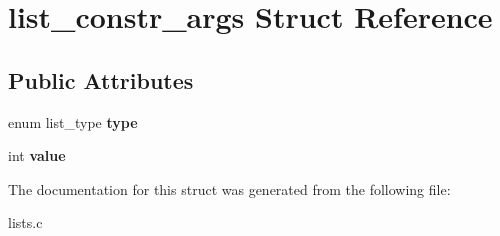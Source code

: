 \hypertarget{structlist__constr__args}{}\section{list\+\_\+constr\+\_\+args Struct Reference}
\label{structlist__constr__args}
\subsection*{Public Attributes}
\begin{DoxyCompactItemize}
\item 
\mbox{\label{structlist__constr__args_abf60829ebf7a89e6ca637b3111ce02c8}} 
enum list\+\_\+type {\bfseries type}
\item 
\mbox{\label{structlist__constr__args_a19d03d2b8142d311c66314b405c7555d}} 
int {\bfseries value}
\end{DoxyCompactItemize}


The documentation for this struct was generated from the following file\+:\begin{DoxyCompactItemize}
\item 
lists.\+c\end{DoxyCompactItemize}
